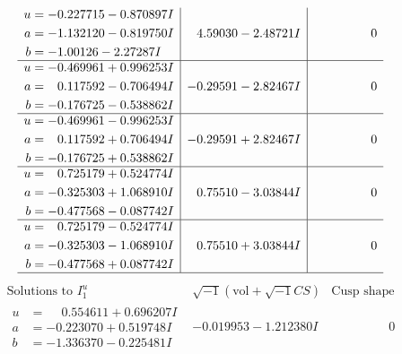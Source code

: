 \documentclass[1p]{elsarticle_modified}
\theoremstyle{definition}
\newcommand{\I}{\sqrt{-1}}
\begin{document}
$$\begin{array}{c|c|c}
\begin{aligned}
u &= -0.227715 - 0.870897 I \\
a &= -1.132120 - 0.819750 I \\
b &= -1.00126 - 2.27287 I\end{aligned}
 & \phantom{-}4.59030 - 2.48721 I & \phantom{-0.000000 } 0 \\ \hline\begin{aligned}
u &= -0.469961 + 0.996253 I \\
a &= \phantom{-}0.117592 - 0.706494 I \\
b &= -0.176725 - 0.538862 I\end{aligned}
 & -0.29591 - 2.82467 I & \phantom{-0.000000 } 0 \\ \hline\begin{aligned}
u &= -0.469961 - 0.996253 I \\
a &= \phantom{-}0.117592 + 0.706494 I \\
b &= -0.176725 + 0.538862 I\end{aligned}
 & -0.29591 + 2.82467 I & \phantom{-0.000000 } 0 \\ \hline\begin{aligned}
u &= \phantom{-}0.725179 + 0.524774 I \\
a &= -0.325303 + 1.068910 I \\
b &= -0.477568 - 0.087742 I\end{aligned}
 & \phantom{-}0.75510 - 3.03844 I & \phantom{-0.000000 } 0 \\ \hline\begin{aligned}
u &= \phantom{-}0.725179 - 0.524774 I \\
a &= -0.325303 - 1.068910 I \\
b &= -0.477568 + 0.087742 I\end{aligned}
 & \phantom{-}0.75510 + 3.03844 I & \phantom{-0.000000 } 0\\
 \hline 
 \end{array}$$\newpage$$\begin{array}{c|c|c}  
\text{Solutions to }I^u_{1}& \I (\text{vol} + \sqrt{-1}CS) & \text{Cusp shape}\\
 \hline 
\begin{aligned}
u &= \phantom{-}0.554611 + 0.696207 I \\
a &= -0.223070 + 0.519748 I \\
b &= -1.336370 - 0.225481 I\end{aligned}
 & -0.019953 - 1.212380 I & \phantom{-0.000000 } 0 \\ \hline\begin{aligned}

\end{aligned}
\end{array}$$
\end{document}
